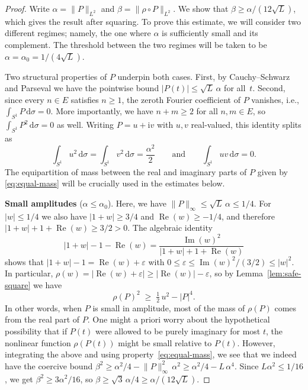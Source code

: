 \documentclass[11pt]{amsart}
\theoremstyle{remark}
\begin{document}
\begin{proof}
Write $\alpha = \lVert P \rVert_{L^2}$ and $\beta = \lVert \rho \circ P \rVert_{L^2}$.
We show that $\beta \ge \alpha/(12\sqrt{L})$, which gives the result after
squaring. To prove this estimate, we will consider two different regimes; namely, the one where $\alpha$ is sufficiently small and its complement. The threshold between the two regimes will be taken to be
$\alpha=\alpha_0 = 1/(4\sqrt{L})$.
 \vspace{0.5em}

Two structural properties of $P$ underpin both cases.  First,
by Cauchy--Schwarz and Parseval we have the pointwise bound
$\lvert P(t) \rvert \le \sqrt{L}\, \alpha$ for all~$t$.
Second, since every $n \in E$ satisfies $n \ge 1$, the zeroth Fourier
coefficient of $P$ vanishes, i.e.,
$\int_{S^1} P\,\mathrm{d}\sigma = 0$.
More importantly, we have $n + m \ge 2$ for all $n, m \in E$, so
$\int_{S^1} P^2\,\mathrm{d}\sigma = 0$ as well.  Writing $P = u + \mathrm{i} v$ with
$u, v$ real-valued, this identity splits as
\begin{equation}\label{eq:equal-mass}
\int_{S^1} u^2\,\mathrm{d}\sigma
= \int_{S^1} v^2\,\mathrm{d}\sigma
= \frac{\alpha^2}{2}
\qquad\text{and}\qquad
\int_{S^1} uv\,\mathrm{d}\sigma = 0.
\end{equation}
The equipartition of mass between the real and imaginary parts of $P$ given by \eqref{eq:equal-mass} will be crucially used in the estimates below.
 \vspace{0.5em}

\noindent
\textbf{Small amplitudes} ($\alpha \le \alpha_0$).
Here, we have $\lVert P \rVert_\infty \le \sqrt{L}\,\alpha \le 1/4$.  For $\lvert w \rvert \le 1/4$
we also have $\lvert 1+w \rvert \ge 3/4$ and $\operatorname{Re}(w) \ge -1/4$, and therefore
$\lvert 1+w \rvert + 1 + \operatorname{Re}(w) \ge 3/2 > 0$.  The algebraic identity
\[
\lvert 1+w \rvert - 1 - \operatorname{Re}(w)
= \frac{\operatorname{Im}(w)^2}{\lvert 1+w \rvert + 1 + \operatorname{Re}(w)}
\]
shows that $\lvert 1+w \rvert - 1 = \operatorname{Re}(w) + \varepsilon$ with
$0 \le \varepsilon \le \operatorname{Im}(w)^2/(3/2) \le \lvert w \rvert^2$.  In particular,
$\rho(w) = \bigl\lvert \operatorname{Re}(w) + \varepsilon\bigr\rvert \ge
\lvert \operatorname{Re}(w) \rvert - \varepsilon$, so by 
Lemma~\ref{lem:safe-square} we have
\[
\rho(P)^2 \;\ge\; \tfrac{1}{2}\, u^2 - \lvert P \rvert^4.
\]
In other words, when $P$ is small in amplitude, most of the mass of $\rho(P)$ comes from the real part of $P$. One might a priori worry about the hypothetical possibility that if $P(t)$ were allowed to be purely imaginary for most $t$, the nonlinear function $\rho(P(t))$ might be small relative to $P(t)$. However, integrating the above and using property~\eqref{eq:equal-mass}, we see that we indeed have the coercive bound
$\beta^2 \ge \alpha^2/4 - \lVert P \rVert_\infty^2\, \alpha^2 \ge \alpha^2/4 - L\,\alpha^4$.
Since $L\alpha^2 \le 1/16$, we get $\beta^2 \ge 3\alpha^2/16$, so
$\beta \ge \sqrt{3}\,\alpha/4 \ge \alpha/(12\sqrt{L})$.
 \vspace{0.5em}


\end{proof}
\end{document}
